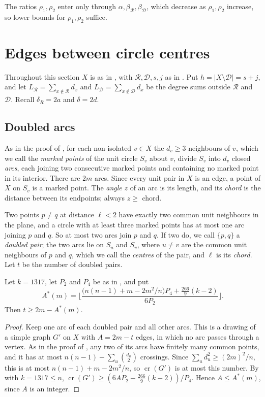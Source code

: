 \documentclass[11pt,colorlinks]{charlie}
\newcommand{\cR}{\mathcal{R}}
\newcommand{\cD}{\mathcal{D}}
\newcommand{\cro}{\operatorname{cr}}
\begin{document}
The ratios $\rho_1,\rho_2$ enter only through $\alpha,\beta_\cR,\beta_\cD$, which decrease as $\rho_1,\rho_2$ increase, so lower bounds for $\rho_1,\rho_2$ suffice.

\section{Edges between circle centres}\label{sec:centres}

Throughout this section $X$ is as in , with $\cR,\cD,s,j$ as in . Put $h=|X\setminus\cD|=s+j$, and let $L_\cR=\sum_{x\notin\cR}d_x$ and $L_\cD=\sum_{x\notin\cD}d_x$ be the degree sums outside $\cR$ and $\cD$. Recall $\delta_R=2a$ and $\delta=2d$.

\subsection{Doubled arcs}
As in the proof of , for each non-isolated $v\in X$ the $d_v\ge3$ neighbours of $v$, which we call the \emph{marked points} of the unit circle $S_v$ about $v$, divide $S_v$ into $d_v$ closed \emph{arcs}, each joining two consecutive marked points and containing no marked point in its interior. There are $2m$ arcs. Since every unit pair in $X$ is an edge, a point of $X$ on $S_v$ is a marked point. The \emph{angle} $z$ of an arc is its length, and its \emph{chord} is the distance between its endpoints; always $z\ge$ chord.

Two points $p\ne q$ at distance $\ell<2$ have exactly two common unit neighbours in the plane, and a circle with at least three marked points has at most one arc joining $p$ and $q$. So at most two arcs join $p$ and $q$. If two do, we call $\{p,q\}$ a \emph{doubled pair}; the two arcs lie on $S_u$ and $S_v$, where $u\ne v$ are the common unit neighbours of $p$ and $q$, which we call the \emph{centres} of the pair, and $\ell$ is its \emph{chord}. Let $t$ be the number of doubled pairs.

\begin{lemma}\label{lem:doubled}
Let $k=1317$, let $P_2$ and $P_4$ be as in , and put
\[
 A^*(m)=\Big\lfloor\frac{\big(n(n-1)+m-2m^2/n\big)P_4+\tfrac{266}9(k-2)}{6P_2}\Big\rfloor .
\]
Then $t\ge2m-A^*(m)$.
\end{lemma}

\begin{proof}
Keep one arc of each doubled pair and all other arcs. This is a drawing of a simple graph $G'$ on $X$ with $A=2m-t$ edges, in which no arc passes through a vertex. As in the proof of , any two of its arcs have finitely many common points, and it has at most $n(n-1)-\sum_u\binom{d_u}2$ crossings. Since $\sum_ud_u^2\ge(2m)^2/n$, this is at most $n(n-1)+m-2m^2/n$, so $\cro(G')$ is at most this number. By  with $k=1317\le n$, $\cro(G')\ge(6AP_2-\frac{266}9(k-2))/P_4$. Hence $A\le A^*(m)$, since $A$ is an integer.
\end{proof}
\end{document}
